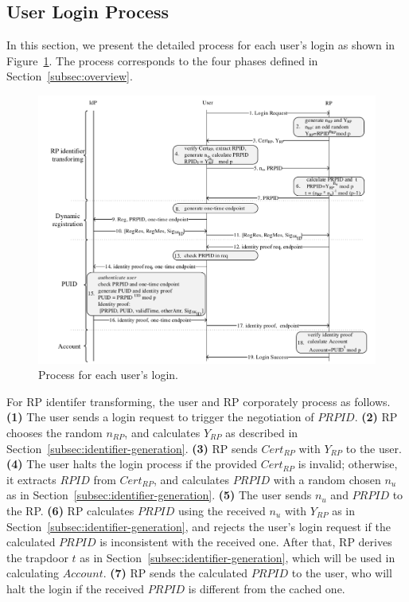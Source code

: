 \subsection{User Login Process}
\label{sebsec:loginprocess}
In this section, we present the detailed process for each user's login as shown in Figure~\ref{fig:process}. The process corresponds to the four phases defined in Section~\ref{subsec:overview}.

\begin{figure}
  \centering
  \includegraphics[width=\linewidth]{fig/process.pdf}
  \caption{Process for each user's login.}
  \label{fig:process}
\end{figure}

For RP identifer transforming, the user and RP corporately process as follows. \textbf{(1)} The user sends a login request to trigger the negotiation of $PRPID$. \textbf{(2)} RP chooses the random $n_{RP}$, and calculates $Y_{RP}$ as described in Section~\ref{subsec:identifier-generation}. \textbf{(3)} RP sends $Cert_{RP}$ with $Y_{RP}$ to the user.  \textbf{(4)} The user halts the login process if the provided $Cert_{RP}$ is invalid; otherwise, it extracts $RPID$ from $Cert_{RP}$, and calculates $PRPID$ with a random chosen $n_u$ as in Section~\ref{subsec:identifier-generation}. \textbf{(5)} The user sends $n_u$ and $PRPID$ to the RP. \textbf{(6)} RP calculates $PRPID$ using the received $n_u$ with $Y_{RP}$ as in Section~\ref{subsec:identifier-generation}, and rejects the user's login request if the calculated $PRPID$ is inconsistent with the received one. After that, RP derives the trapdoor $t$ as in Section~\ref{subsec:identifier-generation}, which will be used in calculating $Account$. \textbf{(7)} RP sends the calculated $PRPID$ to the user, who will halt the login if the received $PRPID$ is different from the cached one.

